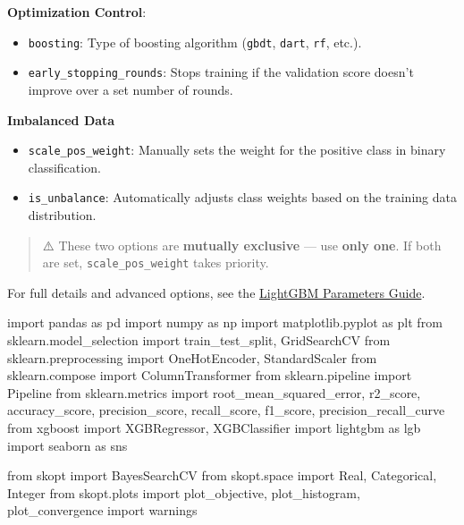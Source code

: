 \documentclass[
  letterpaper,
  DIV=11,
  numbers=noendperiod]{scrreprt}
\newenvironment{Shaded}{\begin{snugshade}}{\end{snugshade}}
\newcommand{\ImportTok}[1]{\textcolor[rgb]{0.00,0.46,0.62}{#1}}
\newcommand{\NormalTok}[1]{\textcolor[rgb]{0.00,0.23,0.31}{#1}}
\providecommand{\tightlist}{%
  \setlength{\itemsep}{0pt}\setlength{\parskip}{0pt}}\usepackage{longtable,booktabs,array}
\begin{document}
\textbf{Optimization Control}:

\begin{itemize}
\tightlist
\item
  \texttt{boosting}: Type of boosting algorithm (\texttt{gbdt},
  \texttt{dart}, \texttt{rf}, etc.).
\item
  \texttt{early\_stopping\_rounds}: Stops training if the validation
  score doesn't improve over a set number of rounds.
\end{itemize}

\textbf{Imbalanced Data}

\begin{itemize}
\tightlist
\item
  \texttt{scale\_pos\_weight}: Manually sets the weight for the positive
  class in binary classification.
\item
  \texttt{is\_unbalance}: Automatically adjusts class weights based on
  the training data distribution.
\end{itemize}

\begin{quote}
⚠️ These two options are \textbf{mutually exclusive} --- use
\textbf{only one}. If both are set, \texttt{scale\_pos\_weight} takes
priority.
\end{quote}

For full details and advanced options, see the
\href{https://lightgbm.readthedocs.io/en/latest/Parameters.html}{LightGBM
Parameters Guide}.

\begin{Shaded}
\begin{Highlighting}[]
\ImportTok{import}\NormalTok{ pandas }\ImportTok{as}\NormalTok{ pd}
\ImportTok{import}\NormalTok{ numpy }\ImportTok{as}\NormalTok{ np}
\ImportTok{import}\NormalTok{ matplotlib.pyplot }\ImportTok{as}\NormalTok{ plt}
\ImportTok{from}\NormalTok{ sklearn.model\_selection }\ImportTok{import}\NormalTok{ train\_test\_split, GridSearchCV}
\ImportTok{from}\NormalTok{ sklearn.preprocessing }\ImportTok{import}\NormalTok{ OneHotEncoder, StandardScaler}
\ImportTok{from}\NormalTok{ sklearn.compose }\ImportTok{import}\NormalTok{ ColumnTransformer}
\ImportTok{from}\NormalTok{ sklearn.pipeline }\ImportTok{import}\NormalTok{ Pipeline}
\ImportTok{from}\NormalTok{ sklearn.metrics }\ImportTok{import}\NormalTok{ root\_mean\_squared\_error, r2\_score, accuracy\_score, precision\_score, recall\_score, f1\_score, precision\_recall\_curve}
\ImportTok{from}\NormalTok{ xgboost }\ImportTok{import}\NormalTok{ XGBRegressor, XGBClassifier}
\ImportTok{import}\NormalTok{ lightgbm }\ImportTok{as}\NormalTok{ lgb}
\ImportTok{import}\NormalTok{ seaborn }\ImportTok{as}\NormalTok{ sns}

\ImportTok{from}\NormalTok{ skopt }\ImportTok{import}\NormalTok{ BayesSearchCV}
\ImportTok{from}\NormalTok{ skopt.space }\ImportTok{import}\NormalTok{ Real, Categorical, Integer}
\ImportTok{from}\NormalTok{ skopt.plots }\ImportTok{import}\NormalTok{ plot\_objective, plot\_histogram, plot\_convergence}
\ImportTok{import}\NormalTok{ warnings}
\end{Highlighting}
\end{Shaded}
\end{document}
